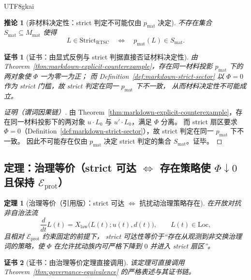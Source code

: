 \documentclass[12pt]{article}
\newtheorem{theorem}{定理}[section]
\newtheorem{corollary}{推论}[section]
\newtheorem{certificate}{证书}[section]
\begin{document}
\begin{CJK*}{UTF8}{gkai}
\begin{corollary}[非材料决定性：strict 判定不可能仅由 $p_{\mathrm{mat}}$ 决定]
\label{cor:markdown-nonmaterial-determinacy}
不存在集合 $S_{\mathrm{mat}}\subseteq M_{\mathrm{mat}}$ 使得
\[
L\in\mathrm{Strict}_{\mathrm{RTSC}}
\quad\Longleftrightarrow\quad
p_{\mathrm{mat}}(L)\in S_{\mathrm{mat}}.
\]
\end{corollary}

\begin{certificate}[证书：由显式反例与 strict 判据直接否证材料决定性]
\label{cert:markdown-nonmaterial-determinacy}
由 Theorem~\ref{thm:markdown-explicit-counterexample}，存在同一材料投影 $p_{\mathrm{mat}}$ 下的两对象使 $\Phi$ 一为零一为正；
而 Definition~\ref{def:markdown-strict-sector} 以 $\Phi=0$ 作为 strict 门槛，故 strict 判定在同一 $p_{\mathrm{mat}}$ 下不一致，
  从而材料决定性不可能成立。
\end{certificate}

\begin{proof}[证明（谓词因果链）]
由 Theorem~\ref{thm:markdown-explicit-counterexample}，存在同一材料投影下的两对象 $u\cdot L_0$ 与 $u'\cdot L_0$，满足 $\Phi$ 分离。
而 strict 扇区要求 $\Phi=0$（Definition~\ref{def:markdown-strict-sector}），故 strict 判定在同一 $p_{\mathrm{mat}}$ 下不一致。
因此不可能存在仅由 $p_{\mathrm{mat}}$ 决定 strict 判定的集合 $S_{\mathrm{mat}}$。证毕。
\end{proof}

\subsection{定理：治理等价（strict 可达 $\Longleftrightarrow$ 存在策略使 $\Phi\downarrow 0$ 且保持 $\mathcal{E}_{\mathrm{prot}}$）}

\begin{theorem}[治理等价（引用版）：strict 可达 $\Longleftrightarrow$ 抗扰动治理策略存在]
\label{thm:markdown-governance-equivalence}
在开放对抗非自治法流
\[
\frac{d}{dt}L(t)=X_{\mathrm{law}}\bigl(L(t);u(t),d(t)\bigr),\qquad L(t)\in\mathrm{Loc},
\]
且相对 $\mathcal{E}_{\mathrm{prot}}$ 约束固定的前提下，
strict 可达性等价于“存在从观测到非交换治理词的策略，使 $\Phi$ 在允许扰动族内可严格下降到 $0$ 并进入 strict 扇区”。
\end{theorem}

\begin{certificate}[证书：由治理等价定理直接调用]
\label{cert:markdown-governance-equivalence}
该定理可直接调用 Theorem~\ref{thm:governance-equivalence} 的严格表述与其证书链。
\end{certificate}


\end{CJK*}
\end{document}
